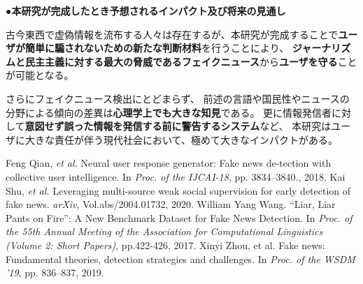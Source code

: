 {	\noindent
	●\textbf{本研究が完成したとき予想されるインパクト及び将来の見通し}

	古今東西で虚偽情報を流布する人々は存在するが、本研究が完成することで\textbf{ユーザが簡単に騙されないための新たな判断材料}を行うことにより、
	\textbf{ジャーナリズムと民主主義に対する最大の脅威であるフェイクニュース}\cite{zhou2019wsdm}から\textbf{ユーザを守る}ことが可能となる。

	さらにフェイクニュース検出にとどまらず、
	前述の言語や国民性やニュースの分野による傾向の差異は\textbf{心理学上でも大きな知見}である。
	更に情報発信者に対して\textbf{意図せず誤った情報を発信する前に警告するシステム}など、
	本研究はユーザに大きな責任が伴う現代社会において、極めて⼤きなインパクトがある。

	

	{\footnotesize
		\begin{thebibliography}{99}
			\setcounter{enumiv}{7}
			\vspace*{-2mm}
			\setlength{\parskip}{0cm}
			\setlength{\itemsep}{0cm}
			\begin{spacing}{0.7}
				 Feng Qian, \textit{et al.} Neural user response generator: Fake news de-tection with collective user intelligence. In \textit{Proc. of the IJCAI-18}, pp. 3834–3840., 2018.
				 Kai Shu, \textit{et al.} Leveraging multi-source weak social supervision for early detection of fake news. \textit{arXiv}, Vol.abs/2004.01732, 2020.
				William Yang Wang. ``Liar, Liar Pants on Fire'': A New Benchmark Dataset for Fake News Detection. In \textit{Proc. of the 55th Annual Meeting of the Association for Computational Linguistics (Volume 2: Short Papers)}, pp.422-426, 2017.
				Xinyi Zhou, et al. Fake news: Fundamental theories, detection strategies and challenges. In \textit{Proc. of the WSDM '19}, pp. 836–837, 2019.
			\end{spacing}
		\end{thebibliography}
	}
}

